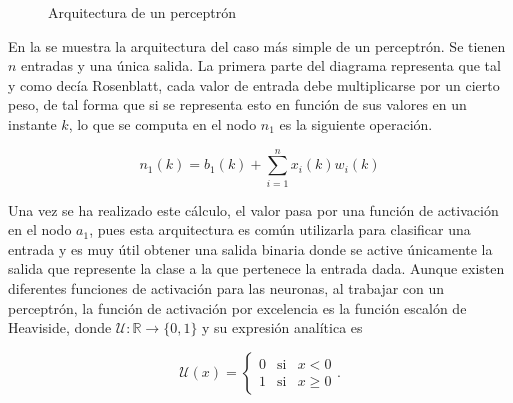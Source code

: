 		\begin{figure}[!h]
			\centering
			\caption{Arquitectura de un perceptrón}
			\label{fig:perceptron}
		\end{figure}
		
		En la  se muestra la arquitectura del caso más simple de un perceptrón. Se tienen $n$ entradas y una única salida. La primera parte del diagrama representa que tal y como decía Rosenblatt, cada valor de entrada debe multiplicarse por un cierto peso, de tal forma que si se representa esto en función de sus valores en un instante $k$, lo que se computa en el nodo $n_1$ es la siguiente operación. 
		
		$$
		n_1(k) = b_1(k) + \sum_{i=1}^n x_i(k)w_i(k)
		$$
		
		Una vez se ha realizado este cálculo, el valor pasa por una función de activación en el nodo $a_1$, pues esta arquitectura es común utilizarla para clasificar una entrada y es muy útil obtener una salida binaria donde se active únicamente la salida que represente la clase a la que pertenece la entrada dada. Aunque existen diferentes funciones de activación para las neuronas, al trabajar con un perceptrón, la función de activación por excelencia es la función escalón de Heaviside, donde $\mathcal{U}: \mathbb{R} \longrightarrow \{0, 1\}$ y su expresión analítica es
		
		$$
		\mathcal{U}(x) = \left\{\begin{array}{ccc}
			0 & \text{si} & x < 0\\
			1 & \text{si} & x \geq 0
		\end{array}
		\right..
		$$
		
